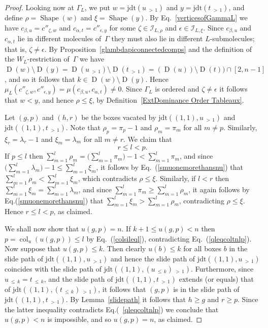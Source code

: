 \documentclass[10pt]{amsart}
\theoremstyle{definition}
\DeclareMathOperator{\col}{col}
\newcommand{\morethan}[2]{#1\,{_{>\,#2}}}
\newcommand{\Lessthan}[2]{#1\,{_{\leqslant\,#2}}}
\newcommand{\jdt}{\mathrm{jdt}}
\DeclareMathOperator{\shape}{Shape}
\DeclareMathOperator{\D}{D}
\begin{document}
\begin{proof}
Looking now at $\Gamma_L$, we put $w=\jdt(\morethan u1)$ and $y=\jdt(\morethan t1)$,
and define $\rho=\shape(w)$ and $\xi=\shape (y)$.
By Eq.~\eqref{verticesofGammaL} we have $c_{\beta,u}=c''_{\zeta,w}$ and
$c_{\alpha,t}=c''_{\epsilon,y}$ for some $\zeta\in\mathcal{I}_{L,\rho}$ and
$\epsilon\in\mathcal{I}_{L,\xi}$. Since $c_{\beta,u}$ and $c_{\alpha,t}$
lie in different molecules of~$\Gamma$ they must also lie in different
$L$-submolecules; that is, $\zeta\ne\epsilon$. By
Proposition~\ref{glambdapiconnectedcomps} and the definition of the $W_L$-restriction
of~$\Gamma$ we have $\D(w)\setminus\D(y)=\D(\morethan u1)\setminus\D(\morethan t1)=
(\D(u))\setminus\D(t))\cap[2,n-1]$, and so it follows that $k\in\D(w)\setminus\D(y)$.
Hence $\mu_L(c''_{\zeta,w},c''_{\epsilon,y})=\mu(c_{\beta,u},c_{\alpha,t})\neq 0$.
Since $\Gamma_L$ is ordered and $\zeta\neq\epsilon$
it follows that $w<y$, and hence $\rho\leqslant\xi$,
by Definition~\ref{ExtDominance Order Tableaux}.

Let $(g,p)$ and $(h,r)$ be the boxes vacated by $\jdt((1,1),\morethan u1)$
and $\jdt((1,1),\morethan t1)$. Note that $\rho_p=\pi_p-1$ and $\rho_m=\pi_m$
for all $m\ne p$. Similarly, $\xi_r=\lambda_r-1$ and $\xi_m=\lambda_m$ for
all $m\ne r$. We claim that
\begin{equation}\label{qleqcoltnlp}
r\leqslant l<p.
\end{equation}
If $p\leqslant l$ then
$\sum_{m=1}^l \rho_m =\bigl(\sum_{m=1}^l \pi_m\bigr)-1<\sum_{m=1}^l \pi_m$,
and since $\bigl(\sum_{m=1}^l \lambda_m\bigr) - 1\leqslant\sum_{m=1}^l\xi_m$,
it follows by Eq.~(\ref{smuonemorethansnu}) that
$\sum_{m=1}^l \rho_m <\sum_{m=1}^l\xi_m$, which contradicts $\rho\leqslant\xi$.
Similarly, if $l<r$ then $\sum_{m=1}^l \xi_m = \sum_{m=1}^l \lambda_m$,
and since $\sum_{m=1}^l \pi_m \geqslant \sum_{m=1}^l \rho_m$, it again follows by
Eq.(\ref{smuonemorethansnu}) that $\sum_{m=1}^l \xi_m > \sum_{m=1}^l \rho_m$,
contradicting $\rho\leqslant\xi$. Hence $r\leqslant l<p$, as claimed.

We shall now show that $u(g,p)=n$.
If $k+1\leqslant u(g,p)<n$ then $p=\col_u(u(g,p))\leqslant l$ by Eq.~(\ref{colsileql}),
contradicting Eq.~(\ref{qleqcoltnlp}). Now suppose that $u(g,p)\leqslant k$. Then
clearly $u(b)\leqslant k$ for all boxes $b$ in the slide path of $\jdt((1,1),\morethan u1)$
and hence the slide path of $\jdt((1,1),\morethan u1)$ coincides with the
slide path of $\jdt((1,1),\morethan{(\Lessthan uk)}1)$. Furthermore, since
$\Lessthan uk=\Lessthan tk$, and the slide path of $\jdt((1,1),\morethan t1)$
extends (or equals) that of $\jdt((1,1),\morethan{(\Lessthan tk)}1)$, it follows that
$(g,p)$ is in the slide path of $\jdt((1,1),\morethan t1)$. By Lemma~\ref{slidepath}
it follows that $h\geqslant g$ and $r\geqslant p$. Since the latter inequality
contradicts Eq.(~\ref{qleqcoltnlp}) we conclude that $u(g,p)<n$ is impossible, and
so $u(g,p)=n$, as claimed.


\end{proof}
\end{document}
